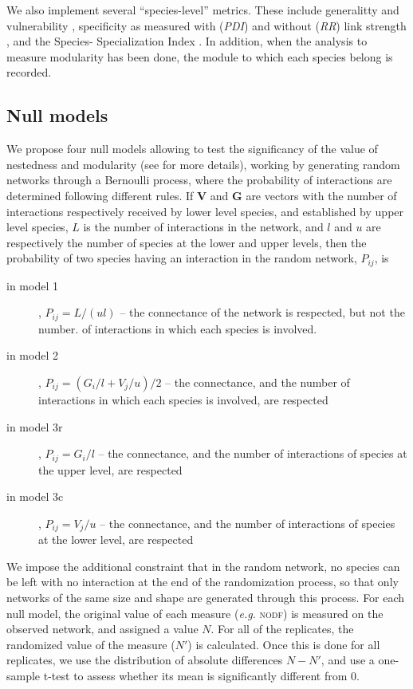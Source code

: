 \documentclass[10pt]{bmc_article}
\newenvironment{bmcformat}{\fussy\setboolean{publ}{true}}{\fussy}
\begin{document}
\begin{bmcformat}
We also implement several ``species-level'' metrics. These include generalitty
and vulnerability \cite{Schoener1979}, specificity as measured with (\emph{PDI}) and without
(\emph{RR}) link strength \cite{PoisotMEE2011}, and the Species-
Specialization Index \cite{Julliard2006}. In addition, when the analysis to
measure modularity has been done, the module to which each species belong is
recorded.

\subsection*{Null models}

We propose four null models allowing to test the significancy of the value of
nestedness and modularity (see \cite{Bascompte2003,Ulrich2007,Flores2011} for
more details), working by generating random networks through a Bernoulli
process, where the probability of interactions are determined following
different rules. If $\mathbf{V}$ and $\mathbf{G}$ are vectors with the number
of interactions respectively received by lower level species, and established
by upper level species, $L$ is the number of interactions in the network, and
$l$ and $u$ are respectively the number of species at the lower and upper
levels, then the probability of two species having an interaction in the
random network, $P_{ij}$, is

\begin{description}
  \item[in model 1], $P_{ij} = L/(ul)$ -- the connectance of the network is respected, but not the number. of interactions in which each species is involved.  \item[in model 2], $P_{ij} = (G_{i}/l + V_{j}/u)/2$ -- the connectance, and the number of interactions in which each species is involved, are respected
  \item[in model 3r], $P_{ij} = G_{i}/l$ -- the connectance, and the number of interactions of species at the upper level, are respected
  \item[in model 3c], $P_{ij} = V_{j}/u$ -- the connectance, and the number of interactions of species at the lower level, are respected
\end{description}

We impose the additional constraint that in the random network, no species can
be left with no interaction at the end of the randomization process, so that
only networks of the same size and shape are generated through this process.
For each null model, the original value of each measure (\emph{e.g.}
\textsc{nodf}) is measured on the observed network, and assigned a value $N$.
For all of the replicates, the randomized value of the measure ($N'$) is
calculated. Once this is done for all replicates, we use the distribution of
absolute differences $N-N'$, and use a one-sample t-test to assess whether its
mean is significantly different from 0.


\end{bmcformat}
\end{document}
